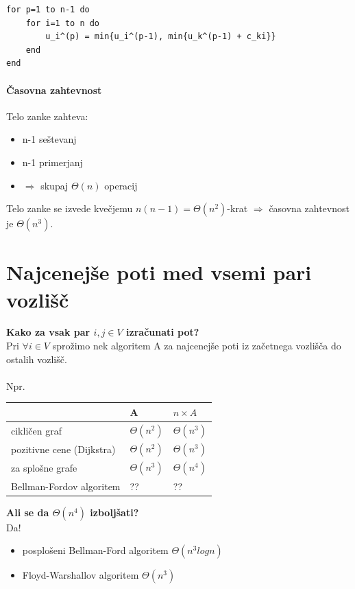 \documentclass[a4paper,10pt]{article}
\begin{document}
\begin{lstlisting}
for p=1 to n-1 do
    for i=1 to n do
        u_i^(p) = min{u_i^(p-1), min{u_k^(p-1) + c_ki}}
    end
end
\end{lstlisting}

\paragraph{\v Casovna zahtevnost}

Telo zanke zahteva:
\begin{itemize}
\item n-1 se\v stevanj
\item n-1 primerjanj
\item $\Rightarrow$ skupaj $\Theta (n)$ operacij
\end{itemize}
Telo zanke se izvede kve\v cjemu $n(n-1) = \Theta (n^2)$-krat $\Rightarrow$ \v casovna zahtevnost je $\Theta (n^3)$.

\section{Najcenej\v se poti med vsemi pari vozli\v s\v c}
\textbf{Kako za vsak par $i, j \in V$ izra\v cunati pot?}\\
Pri $\forall i \in V$ spro\v zimo nek algoritem A za najcenej\v se poti iz za\v cetnega vozli\v s\v ca do ostalih vozli\v s\v c.\\
\\
Npr.\\
\begin{center}
\begin{tabular}[c]{l|ll}\cline{2-3}
				& A			& $n \times A$\\\hline
cikli\v cen graf			& $\Theta (n^2)$	& $\Theta (n^3)$\\
pozitivne cene (Dijkstra)	& $\Theta (n^2)$	& $\Theta (n^3)$\\
za splo\v sne grafe		& $\Theta (n^3)$	& $\Theta (n^4)$\\
Bellman-Fordov algoritem	& ??			& ??
\end{tabular}
\end{center}
\textbf{Ali se da $\Theta (n^4)$ izbolj\v sati?}\\
Da!
\begin{itemize}
\item posplo\v seni Bellman-Ford algoritem $\Theta (n^3 log n)$
\item Floyd-Warshallov algoritem $\Theta (n^3)$
\end{itemize}
\end{document}
